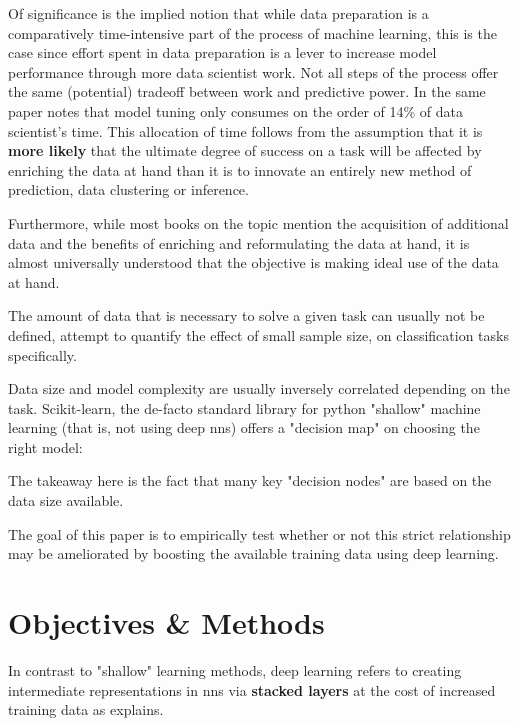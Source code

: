 Of significance is the implied notion that while data preparation is a comparatively time-intensive part of the process of machine learning, this is the case since effort spent in data preparation is a lever to increase model performance through more data scientist work. Not all steps of the process offer the same (potential) tradeoff between work and predictive power. In the same paper \cite{datawrangling_time} notes that model tuning only consumes on the order of 14\% of data scientist's time. This allocation of time follows from the assumption that it is \textbf{more likely} that the ultimate degree of success on a task will be affected by enriching the data at hand than it is to innovate an entirely new method of prediction, data clustering or inference.

Furthermore, while most books on the topic mention the acquisition of additional data and the benefits of enriching and reformulating the data at hand, it is almost universally understood that the objective is making ideal use of the data at hand.

The amount of data that is necessary to solve a given task can usually not be defined, \cite{raudys1991small} attempt to quantify the effect of small sample size, on classification tasks specifically.

\pagebreak

Data size and model complexity are usually inversely correlated depending on the task. Scikit-learn, the de-facto standard library for python "shallow" machine learning (that is, not using deep \acp{nn}) offers a "decision map" on choosing the right model:


The takeaway here is the fact that many key "decision nodes" are based on the data size available.

The goal of this paper is to empirically test whether or not this strict relationship may be ameliorated by boosting the available training data using deep learning.

\pagebreak

\section{Objectives \& Methods}

In contrast to "shallow" learning methods, deep learning refers to creating intermediate representations in \acp{nn} via \textbf{stacked layers} at the cost of increased training data as \cite{swingler1996applying} explains.

